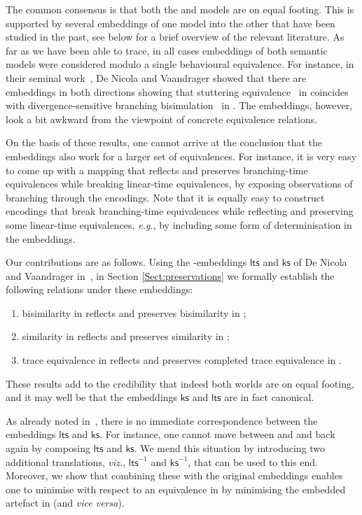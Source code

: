 \documentclass{llncs}
\newcommand{\lts}{\mathsf{lts}}
\newcommand{\ltsrev}{\lts^{-1}}
\newcommand{\ks}{\mathsf{ks}}
\newcommand{\ksrev}{\ks^{-1}}
\newcommand{\eg}{\emph{e.g.}}
\newcommand{\viz}{\emph{viz.}}
\begin{document}
The common consensus is that both the \KS and \LTS models are on
equal footing. This is supported by several embeddings of one model
into the other that have been studied in the past, see below for a
brief overview of the relevant literature.  As far as we have been
able to trace, in all cases embeddings of both semantic models were
considered modulo a single behavioural equivalence. For instance, in
their seminal work~\cite{DBLP:journals/jacm/NicolaV95}, De Nicola and
Vaandrager showed that there are embeddings in both directions showing
that stuttering equivalence~\cite{DBLP:journals/tcs/BrowneCG88}
in \KS coincides with divergence-sensitive branching
bisimulation~\cite{vanGlabbeek96} in \LTS. The embeddings, however,
look a bit awkward from the viewpoint of concrete equivalence relations.

On the basis of these results, one cannot arrive at the conclusion that
the embeddings also work for a larger set of equivalences. For instance,
it is very easy to come up with a mapping that reflects and preserves
branching-time equivalences while breaking linear-time equivalences, by
exposing observations of branching through the encodings.  Note that it is
equally easy to construct encodings that break branching-time equivalences
while reflecting and preserving some linear-time equivalences, \eg,
by including some form of determinisation in the embeddings.

Our contributions are as follows. Using the
\KS-\LTS embeddings $\lts{}$ and $\ks{}$ of De Nicola and
Vaandrager in~\cite{DBLP:conf/litp/NicolaV90}, in Section \ref{Sect:preservations} we formally establish the
following relations under these embeddings:
\begin{enumerate}
\item bisimilarity in \KS reflects and preserves bisimilarity in \LTS;
\item similarity in \KS reflects and preserves similarity in \LTS;
\item trace equivalence in \KS reflects and preserves completed trace equivalence
in \LTS.
\end{enumerate}
These results add to the credibility that indeed both worlds are on
equal footing, and it may well be that the embeddings $\ks$ and $\lts$
are in fact canonical.

As already noted in~\cite{DBLP:conf/litp/NicolaV90}, there is no
immediate correspondence between the embeddings $\lts{}$ and $\ks{}$.
For instance, one cannot move between \KS and \LTS and back again by
composing $\lts{}$ and $\ks{}$. We mend this situation by introducing two
additional translations, \viz, $\ltsrev$ and $\ksrev$, that can be used
to this end. Moreover, we show that combining these with the original
embeddings enables one to minimise with respect to an equivalence in
\KS by minimising the embedded artefact in \LTS (and \emph{vice versa}).
\end{document}
